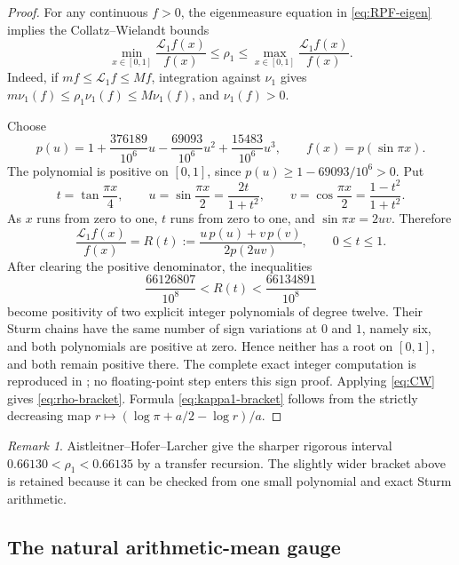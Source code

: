 \documentclass[11pt,oneside]{article}
\numberwithin{equation}{section}
\theoremstyle{definition}
\theoremstyle{remark}
\newtheorem{remark}[theorem]{Remark}
\newcommand{\Transfer}{\mathcal L}
\newcommand{\defeq}{\mathrel{:=}}
\begin{document}
\begin{proof}
For any continuous \(f>0\), the eigenmeasure equation in
\eqref{eq:RPF-eigen} implies the Collatz--Wielandt bounds
\begin{equation}
 \min_{x\in[0,1]}\frac{\Transfer_1f(x)}{f(x)}
 \le\rho_1\le
 \max_{x\in[0,1]}\frac{\Transfer_1f(x)}{f(x)}.
 \label{eq:CW}
\end{equation}
Indeed, if \(mf\le\Transfer_1f\le Mf\), integration against \(\nu_1\) gives
\(m\nu_1(f)\le\rho_1\nu_1(f)\le M\nu_1(f)\), and \(\nu_1(f)>0\).

Choose
\begin{equation}
 p(u)=1+\frac{376189}{10^6}u-\frac{69093}{10^6}u^2
       +\frac{15483}{10^6}u^3,
 \qquad f(x)=p(\sin\pi x).
 \label{eq:certificate-p}
\end{equation}
The polynomial is positive on \([0,1]\), since
\(p(u)\ge1-69093/10^6>0\).  Put
\[
 t=\tan\frac{\pi x}{4},\qquad
 u=\sin\frac{\pi x}{2}=\frac{2t}{1+t^2},\qquad
 v=\cos\frac{\pi x}{2}=\frac{1-t^2}{1+t^2}.
\]
As \(x\) runs from zero to one, \(t\) runs from zero to one, and
\(\sin\pi x=2uv\).  Therefore
\begin{equation}
 \frac{\Transfer_1f(x)}{f(x)}
 =R(t)\defeq\frac{u\,p(u)+v\,p(v)}{2p(2uv)},
 \qquad 0\le t\le1.
 \label{eq:R-certificate}
\end{equation}
After clearing the positive denominator, the inequalities
\[
 \frac{66126807}{10^8}<R(t)<\frac{66134891}{10^8}
\]
become positivity of two explicit integer polynomials of degree twelve.  Their Sturm chains
have the same number of sign variations at \(0\) and \(1\), namely six, and both
polynomials are positive at zero.  Hence neither has a root on \([0,1]\), and both remain
positive there.  The complete exact integer computation is reproduced in
; no floating-point step enters this sign proof.  Applying
\eqref{eq:CW} gives \eqref{eq:rho-bracket}.  Formula \eqref{eq:kappa1-bracket} follows from
the strictly decreasing map
\(r\mapsto(\log\pi+a/2-\log r)/a\).
\end{proof}

\begin{remark}
Aistleitner--Hofer--Larcher \cite{ahl} give the sharper rigorous interval
\(0.66130<\rho_1<0.66135\) by a transfer recursion.  The slightly wider bracket above is
retained because it can be checked from one small polynomial and exact Sturm arithmetic.
\end{remark}

\subsection{The natural arithmetic-mean gauge}
\end{document}
